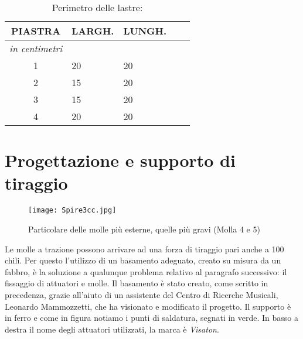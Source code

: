 \begin{table}[htp]
\caption{Perimetro delle lastre:}
\begin{center}

\begin{tabular}{cp{2cm}p{2cm}p{.2cm}p{2cm}} \textbf{PIASTRA}&\textbf{LARGH.}&\textbf{LUNGH.}\\
\hline \textit{in centimetri} \\
\hline 1&20&20\\
\hline 2&15&20\\
\hline 3&15&20\\
\hline 4&20&20\\
\end{tabular}

\end{center}
\label{tab:lastre}
\end{table}%


\section{Progettazione e supporto di tiraggio}


\begin{figure}[htbp]
\begin{center}
\texttt{[image: Spire3cc.jpg]}
\caption{Particolare delle molle più esterne, quelle più gravi (Molla 4 e 5)}
\label{fig:partmolle}
\end{center}
\end{figure}

Le molle a trazione possono arrivare ad una forza di tiraggio pari anche a 100 chili. Per questo l'utilizzo di un basamento adeguato, creato su misura da un fabbro, è la soluzione a qualunque problema relativo al paragrafo successivo: il fissaggio di attuatori e molle.
Il basamento è stato creato, come scritto in precedenza, grazie all'aiuto di un assistente del Centro di Ricerche Musicali, Leonardo Mammozzetti, che ha visionato e modificato il progetto. Il supporto è in ferro e come in figura \label{fig:basamento} notiamo i punti di saldatura, segnati in verde. In basso a destra il nome degli attuatori utilizzati, la marca è \emph{Visaton}.

